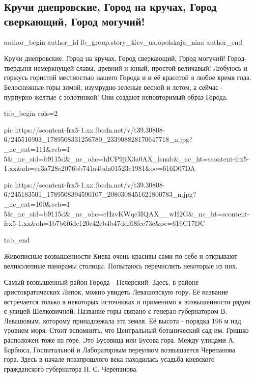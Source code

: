  
 
 
 
 
 
\subsection{Кручи днепровские, Город на кручах, Город сверкающий, Город могучий!}
\label{sec:13_10_2021.fb.fb_group.story_kiev_ua.1.gorod_na_kruchah}
 
\ifcmt
 author_begin
   author_id fb_group.story_kiev_ua,opolskaja_nina
 author_end
\fi

Кручи днепровские, Город на кручах, Город сверкающий, Город могучий!
Город-твердыня немеркнущей славы, древний и юный, простой величавый!  Любуюсь и
горжусь гористой местностью нашего Города и и её красотой в любое время года.
Белоснежные горы зимой, изумрудно-зеленые весной и летом, а сейчас
- пурпурно-желтые с золотинкой! Они создают неповторимый образ Города. 

\ifcmt
  tab_begin cols=2

     pic https://scontent-frx5-1.xx.fbcdn.net/v/t39.30808-6/245516903_1789508331256780_233908828170647718_n.jpg?_nc_cat=111&ccb=1-5&_nc_sid=b9115d&_nc_ohc=hICP9jiX3a0AX_lsnub&_nc_ht=scontent-frx5-1.xx&oh=ce3a728a2076bb741a4bda01523c1981&oe=616D07DA

     pic https://scontent-frx5-1.xx.fbcdn.net/v/t39.30808-6/245183501_1789508394590107_2080308451621800783_n.jpg?_nc_cat=100&ccb=1-5&_nc_sid=b9115d&_nc_ohc=eHzvKWqe3IQAX__wH2G&_nc_ht=scontent-frx5-1.xx&oh=1b7b6f6dc120e42eb4b47ddf68fce73c&oe=616C17DC

  tab_end
\fi

Живописные возвышенности Киева очень красивы сами по себе и открывают
великолепные панорамы столицы. Попытаюсь перечислить некоторые из них. 

Самый возвышенный район Города - Печерский. Здесь, в районе аристократических
Липок, можно увидеть Левашовскую гору. Её название встречается только в
некоторых источниках и применимо к возвышенности рядом с улицей Шелковичной.
Название горы связано с генерал-губернатором В. Левашовым, которому
принадлежала эта земля. Её высота - порядка 196 м над уровнем моря. Стоит
вспомнить, что Центральный ботанический сад им. Гришко расположен тоже на горе.
Это Бусовица или Бусова гора. Между улицами А. Барбюса, Госпитальной и
Лабораторным переулком возвышается Черепанова гора. Здесь в начале позапрошлого
века находилась усадьба киевского гражданского губернатора П. С. Черепанова. 

